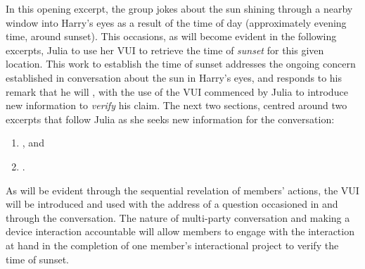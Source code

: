 \begin{revisedsubmission}
In this opening excerpt, the group jokes about the sun shining through a nearby window into Harry's eyes as a result of the time of day (approximately evening time, around sunset).
This occasions, as will become evident in the following excerpts, Julia to use her \ac{VUI} to retrieve the time of \textit{sunset} for this given location.
This work to establish the time of sunset addresses the ongoing concern established in conversation about the sun in Harry's eyes, and responds to his remark that he will , with the use of the \ac{VUI} commenced by Julia to introduce new information to \textit{verify} his claim. The next two sections, centred around two excerpts that follow Julia as she seeks new information for the conversation:
\begin{enumerate}[label=(\roman*)]
    \item {}, and
    \item {}.
\end{enumerate}

As will be evident through the sequential revelation of members' actions, the \ac{VUI} will be introduced and used with the address of a question occasioned in and through the conversation.
The nature of multi-party conversation and making a device interaction accountable will allow members to engage with the interaction at hand in the completion of one member's interactional project to verify the time of sunset.
\end{revisedsubmission}






